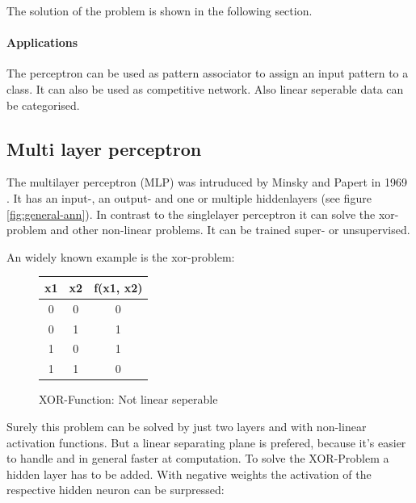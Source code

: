 \documentclass[10pt,a4paper,DIV=11]{scrreprt}
\begin{document}
The solution of the problem is shown in the following section.

\paragraph*{Applications}
The perceptron can be used as pattern associator to assign an input pattern to a class. It can also be used as competitive network. Also linear seperable data can be categorised.

\subsection{Multi layer perceptron} \label{sec:mlp}
The multilayer perceptron (MLP) was intruduced by Minsky and Papert in 1969 \cite{min}. It has an input-, an output- and
one or multiple hiddenlayers (see figure \ref{fig:general-ann}). In contrast to the singlelayer perceptron it can solve the xor-problem and other non-linear problems. It can be trained super- or unsupervised.

An widely known example is the xor-problem:

\begin{figure}[H]
	\centering
	\begin{tabular}{|c|c|c|}
		\hline
		x1 & x2 & f(x1, x2)\\
		\hline
		0 & 0 & 0 \\
		\hline
		0 & 1 & 1 \\
		\hline
		1 & 0 & 1 \\
		\hline
		1 & 1 & 0 \\
		\hline
	\end{tabular}
	\caption{XOR-Function: Not linear seperable}
	\label{fig:nlinsep}

\end{figure}

Surely this problem can be solved by just two layers and with non-linear activation functions. But a linear separating plane is prefered, because it's easier to handle and in general faster at computation.
To solve the XOR-Problem a hidden layer has to be added. With negative weights the activation of the respective hidden neuron can be surpressed:
\end{document}
